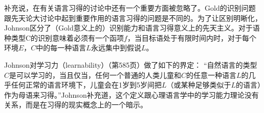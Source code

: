 \citet{Johnson2004a}补充说，在有关语言习得的讨论中还有一个重要方面被忽略了。Gold的识别问题跟先天论大讨论中起到重要作用的语言习得的问题是不同的。为了让区别明晰化，Johnson区分了（Gold意义上的）识别能力和语言习得意义上的先天主义。对于语种类型C的识别意味着必须有一个函项$f$，当目标语处于有限时间内时，对于每个环境$E$，$C$中的每一种语言$L$永远集中到假说$L$。

Johnson对学习力（learnability）（第585页）做了如下的界定：
“自然语言的类型$C$是可以学习的，当且仅当，任何一个普通的人类儿童和$C$的任意一种语言$L$的几乎任何正常的语言环境下，儿童会在1岁到5岁间把$L$（或某种足够类似于$L$的语言）作为母语来习得。”Johnson补充道，这个定义跟心理语言学中的学习能力理论没有关系，而是在习得的现实概念上的一个暗示。

